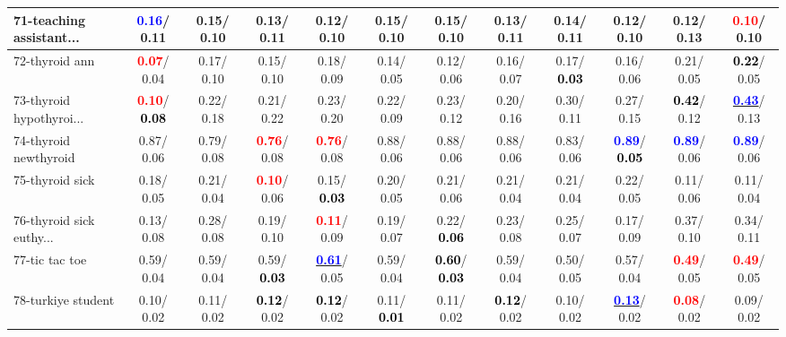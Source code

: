 \begin{table}[h]
\begin{center}
{\begin{tabular}{lc|c|c|c|c|c|c|c|c|c|c}
71-teaching assistant... & \textcolor{blue}{\textbf{  0.16}}/  0.11 &   0.15/  0.10 &   0.13/  0.11 &   0.12/  0.10 &   0.15/  0.10 &   0.15/  0.10 &   0.13/  0.11 &   0.14/  0.11 &   0.12/  0.10 &   0.12/  0.13 & \textcolor{red}{\textbf{  0.10}}/  0.10 \\ \hline
72-thyroid ann & \textcolor{red}{\textbf{  0.07}}/  0.04 &   0.17/  0.10 &   0.15/  0.10 &   0.18/  0.09 &   0.14/  0.05 &   0.12/  0.06 &   0.16/  0.07 &   0.17/\textcolor{black}{\textbf{  0.03}} &   0.16/  0.06 &   0.21/  0.05 & \textcolor{black}{\textbf{  0.22}}/  0.05 \\
73-thyroid hypothyroi... & \textcolor{red}{\textbf{  0.10}}/\textcolor{black}{\textbf{  0.08}} &   0.22/  0.18 &   0.21/  0.22 &   0.23/  0.20 &   0.22/  0.09 &   0.23/  0.12 &   0.20/  0.16 &   0.30/  0.11 &   0.27/  0.15 & \textcolor{black}{\textbf{  0.42}}/  0.12 & \underline{\textcolor{blue}{\textbf{  0.43}}}/  0.13 \\
74-thyroid newthyroid &   0.87/  0.06 &   0.79/  0.08 & \textcolor{red}{\textbf{  0.76}}/  0.08 & \textcolor{red}{\textbf{  0.76}}/  0.08 &   0.88/  0.06 &   0.88/  0.06 &   0.88/  0.06 &   0.83/  0.06 & \textcolor{blue}{\textbf{  0.89}}/\textcolor{black}{\textbf{  0.05}} & \textcolor{blue}{\textbf{  0.89}}/  0.06 & \textcolor{blue}{\textbf{  0.89}}/  0.06 \\
75-thyroid sick &   0.18/  0.05 &   0.21/  0.04 & \textcolor{red}{\textbf{  0.10}}/  0.06 &   0.15/\textcolor{black}{\textbf{  0.03}} &   0.20/  0.05 &   0.21/  0.06 &   0.21/  0.04 &   0.21/  0.04 &   0.22/  0.05 &   0.11/  0.06 &   0.11/  0.04 \\
76-thyroid sick euthy... &   0.13/  0.08 &   0.28/  0.08 &   0.19/  0.10 & \textcolor{red}{\textbf{  0.11}}/  0.09 &   0.19/  0.07 &   0.22/\textcolor{black}{\textbf{  0.06}} &   0.23/  0.08 &   0.25/  0.07 &   0.17/  0.09 &   0.37/  0.10 &   0.34/  0.11 \\
77-tic tac toe &   0.59/  0.04 &   0.59/  0.04 &   0.59/\textcolor{black}{\textbf{  0.03}} & \underline{\textcolor{blue}{\textbf{  0.61}}}/  0.05 &   0.59/  0.04 & \textcolor{black}{\textbf{  0.60}}/\textcolor{black}{\textbf{  0.03}} &   0.59/  0.04 &   0.50/  0.05 &   0.57/  0.04 & \textcolor{red}{\textbf{  0.49}}/  0.05 & \textcolor{red}{\textbf{  0.49}}/  0.05 \\
78-turkiye student &   0.10/  0.02 &   0.11/  0.02 & \textcolor{black}{\textbf{  0.12}}/  0.02 & \textcolor{black}{\textbf{  0.12}}/  0.02 &   0.11/\textcolor{black}{\textbf{  0.01}} &   0.11/  0.02 & \textcolor{black}{\textbf{  0.12}}/  0.02 &   0.10/  0.02 & \underline{\textcolor{blue}{\textbf{  0.13}}}/  0.02 & \textcolor{red}{\textbf{  0.08}}/  0.02 &   0.09/  0.02 \\ \hline

\end{tabular}}
\end{center}
\end{table}
